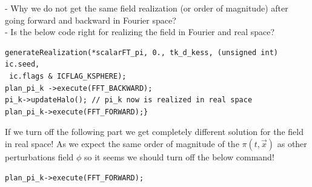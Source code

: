 \documentclass[a4paper,14pt]{article}
\begin{document}
-{\color{red}{Question:}} Why we do not get the same field realization (or order of magnitude) after going forward and backward in Fourier space? \\
- Is the below code right for realizing the field in Fourier and real space?
\begin{lstlisting}
generateRealization(*scalarFT_pi, 0., tk_d_kess, (unsigned int) ic.seed,
 ic.flags & ICFLAG_KSPHERE); 
plan_pi_k ->execute(FFT_BACKWARD);
pi_k->updateHalo();	// pi_k now is realized in real space
plan_pi_k->execute(FFT_FORWARD);}
\end{lstlisting}
If we turn off the following part we get completely different solution for the field in real space! As we expect the same order of magnitude of the $\pi (t,\vec{x})$ as other perturbations field $\phi$ so it seems we should turn off the below command! 
\begin{lstlisting}
plan_pi_k->execute(FFT_FORWARD); 
\end{lstlisting}
\end{document}
